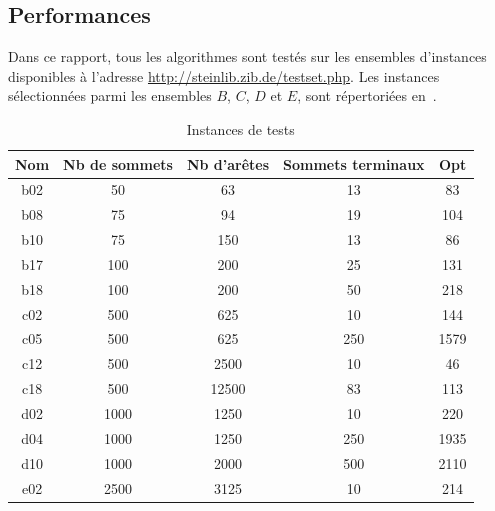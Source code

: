 \documentclass[10pt]{article}
\begin{document}
	\subsection{Performances}
	\label{sec-perf}
	
	Dans ce rapport, tous les algorithmes sont testés sur les ensembles d'instances disponibles à l'adresse \url{http://steinlib.zib.de/testset.php}. Les instances sélectionnées parmi les ensembles $B$, $C$, $D$ et $E$, sont répertoriées en~.
	
	\begin{table}[h!]
		\centering
		\begin{tabular}{|c|c|c|c|c|}
			\hline
			\textbf{Nom} & \textbf{Nb de sommets} & \textbf{Nb d'arêtes} & \textbf{Sommets terminaux} & \textbf{Opt} \\
			\hline
			b02 & 50 & 63 & 13 & 83 \\
			b08	& 75 & 94 &	19 & 104 \\
			b10	& 75 & 150 & 13 & 86 \\
			b17	& 100 &	200 & 25 & 131 \\
			b18	& 100 & 200 & 50 & 218 \\
			c02	& 500 & 625 & 10 & 144 \\
			c05	& 500 & 625 & 250 & 1579 \\
			c12	& 500 & 2500 & 10 & 46 \\
			c18 & 500 & 12500 & 83 & 113 \\
			d02	& 1000 & 1250 & 10 & 220 \\
			d04	& 1000 & 1250 & 250 & 1935 \\
			d10	& 1000 & 2000 &	500 & 2110 \\
			e02	& 2500 & 3125 & 10 & 214 \\
			\hline
		\end{tabular}
		\caption{Instances de tests}
		\label{tab-instances}
	\end{table}
	
\end{document}
